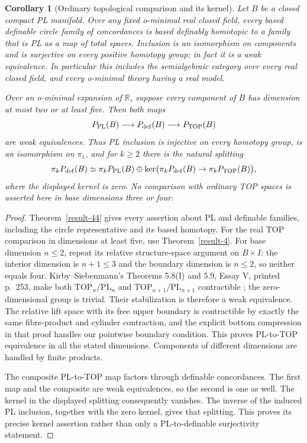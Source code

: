 \documentclass[11pt,a4paper]{article}
\newtheorem{corollary}[theorem]{Corollary}
\theoremstyle{definition}
\begin{document}
\begin{corollary}[Ordinary topological comparison and its kernel]\label{result-56}
Let $B$ be a closed compact PL manifold. Over any fixed o-minimal
real closed field, every based definable circle family of concordances
is based definably homotopic to a family that is PL as a map of total
spaces. Inclusion is an isomorphism on components and is surjective
on every positive homotopy group; in fact it is a weak equivalence.
In particular this includes the semialgebraic category over every
real closed field, and every o-minimal theory having a real model.

Over an o-minimal expansion of $\mathbb R$, suppose every component
of $B$ has dimension at most two or at least five. Then both maps
\[
 P_{\rm PL}(B)\longrightarrow P_{\rm def}(B)
             \longrightarrow P_{\rm TOP}(B)
\]
are weak equivalences. Thus PL inclusion is injective on every
homotopy group, is an isomorphism on $\pi_1$, and for $k\ge2$
there is the natural splitting
\[
 \pi_kP_{\rm def}(B)\simeq\pi_kP_{\rm PL}(B)\oplus
 \ker\bigl(\pi_kP_{\rm def}(B)\to\pi_kP_{\rm TOP}(B)\bigr),
\]
where the displayed kernel is zero. No comparison with ordinary TOP
spaces is asserted here in base dimensions three or four.
\end{corollary}
\begin{proof}
Theorem~\ref{result-44} gives every assertion about PL and definable
families, including the circle representative and its based homotopy.
For the real TOP comparison in dimensions at least five, use
Theorem~\ref{result-4}. For base dimension $n\le2$, repeat its
relative structure-space argument on $B\times I$: the interior
dimension is $n+1\le3$ and the boundary dimension is $n\le2$,
so neither equals four. Kirby--Siebenmann's Theorems 5.8(I) and 5.9,
Essay V, printed p.~253, make both
$\mathrm{TOP}_n/\mathrm{PL}_n$ and
$\mathrm{TOP}_{n+1}/\mathrm{PL}_{n+1}$ contractible
\cite{KirbySiebenmann1977}; the zero-dimensional group is trivial.
Their stabilization is therefore a weak equivalence. The relative
lift space with its free upper boundary is contractible by exactly
the same fibre-product and cylinder contraction, and the explicit
bottom compression in that proof handles our pointwise boundary
condition. This proves PL-to-TOP equivalence in all the stated
dimensions. Components of different dimensions are handled by
finite products.

The composite PL-to-TOP map factors through definable concordances.
The first map and the composite are weak equivalences, so the second
is one as well. The kernel in the displayed splitting consequently
vanishes. The inverse of the induced PL inclusion, together with
the zero kernel, gives that splitting. This proves its precise
kernel assertion rather than only a PL-to-definable surjectivity
statement.
\end{proof}
\end{document}
